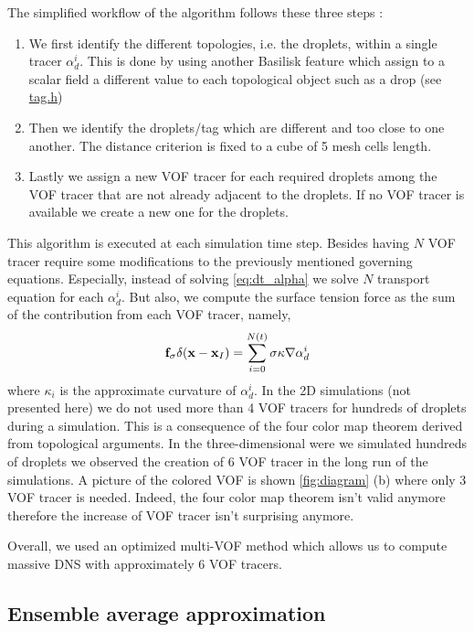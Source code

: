 The simplified workflow of the algorithm follows these three steps : 
\begin{enumerate}
    \item We first identify the different topologies, i.e. the droplets, within a single tracer $\alpha_d^i$. 
    This is done by using another Basilisk feature which assign to a scalar field a different value to each topological object such as a drop (see \href{http://basilisk.fr/src/tag.h}{tag.h})
    \item Then we identify the droplets/tag which are different and too close to one another.
    The distance criterion is fixed to a cube of 5 mesh cells length.  
    \item Lastly we assign a new VOF tracer for each required droplets among the VOF tracer that are not already adjacent to the droplets. 
    If no VOF tracer is available we create a new one for the droplets.
\end{enumerate}
This algorithm is executed at each simulation time step. 
Besides having $N$ VOF tracer require some modifications to the previously mentioned governing equations. 
Especially, instead of solving \ref{eq:dt_alpha}  we solve $N$ transport equation for each $\alpha_d^i$.
But also, we compute the surface tension force as the sum of the contribution from each VOF tracer, namely, 
\begin{equation}
    \textbf{f}_\sigma \delta(\textbf{x}-\textbf{x}_I)
    = \sum_{i=0}^{N(t)} \sigma \kappa \mathbf{\nabla} \alpha_d^i
\end{equation} 
where $\kappa_i$ is the approximate curvature of $\alpha_d^i$. 
In the 2D simulations (not presented here) we do not used more than 4 VOF tracers for hundreds of droplets during a simulation. 
This is a consequence  of the four color map theorem derived from topological arguments.
In the three-dimensional were we simulated hundreds of droplets we observed the creation of $6$ VOF tracer in the long run of the simulations.
A picture of the colored VOF is shown \ref{fig:diagram} (b) where only 3 VOF tracer is needed.
Indeed, the four color map theorem isn't valid anymore therefore the increase of VOF tracer isn't surprising anymore. 

Overall, we used an optimized multi-VOF method which allows us to compute massive DNS with approximately $6$ VOF tracers. 

\subsection{Ensemble average approximation}

